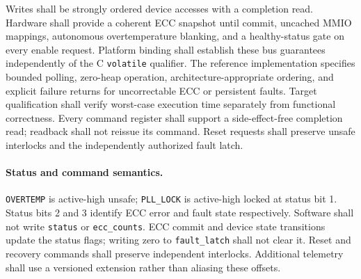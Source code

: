 \documentclass[11pt,a4paper]{article}
\begin{document}
Writes shall be strongly ordered device accesses with a completion read. Hardware shall provide
a coherent ECC snapshot until commit, uncached MMIO mappings, autonomous overtemperature
blanking, and a healthy-status gate on every enable request. Platform binding shall
establish these bus guarantees independently of the C \texttt{volatile} qualifier.
The reference implementation specifies bounded polling, zero-heap operation,
architecture-appropriate ordering, and explicit failure returns for uncorrectable
ECC or persistent faults. Target qualification shall verify worst-case execution time
separately from functional correctness. Every command register shall support a
side-effect-free completion read; readback shall not reissue its command. Reset requests
shall preserve unsafe interlocks and the independently authorized fault latch.

\paragraph{Status and command semantics.}
\texttt{OVERTEMP} is active-high unsafe; \texttt{PLL\_LOCK} is active-high locked at
status bit 1. Status bits 2 and 3 identify ECC error and fault state respectively.
Software shall not write \texttt{status} or \texttt{ecc\_counts}. ECC commit and device
state transitions update the status flags; writing zero to \texttt{fault\_latch}
shall not clear it. Reset and recovery commands shall preserve independent interlocks.
Additional telemetry shall use a versioned extension rather than aliasing these offsets.
\end{document}
